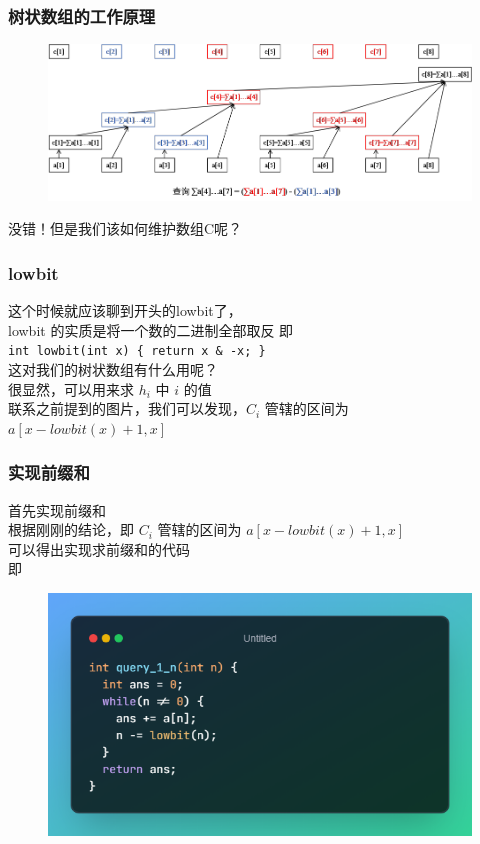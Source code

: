 \documentclass{beamer}
\begin{document}
	\begin{frame}
		\frametitle{树状数组的工作原理}
				\begin{figure}
			\centering
			\includegraphics[width=0.7\linewidth]{pic/BIT}
			\caption{}
			\label{fig:bit}
		\end{figure}
		没错！但是我们该如何维护数组C呢？ \\
	\end{frame}
	
	\begin{frame}
		\frametitle{lowbit}
		这个时候就应该聊到开头的lowbit了，\\
		\pause
		lowbit 的实质是将一个数的二进制全部取反 即\\
		\lstinline|int lowbit(int x) { return x & -x; }| \\
		\pause
		这对我们的树状数组有什么用呢？\\
		\pause
		很显然，可以用来求 $h_i$ 中 $i$ 的值 \\
		\pause
		联系之前提到的图片，我们可以发现，$C_i$ 管辖的区间为 $a[x-lowbit(x)+1, x]$
	
	\end{frame}
	
	\begin{frame}
		\frametitle{实现前缀和}
		首先实现前缀和 \\
		\pause
		根据刚刚的结论，即 $C_i$ 管辖的区间为 $a[x-lowbit(x)+1, x]$ \\
		可以得出实现求前缀和的代码 \\ 
		即 \\ 
		\begin{figure}
			\centering
			\includegraphics[width=0.7\linewidth]{pic/query_1_n}
			\caption{}
			\label{fig:query1n}
		\end{figure}
	\end{frame}
	
\end{document}
